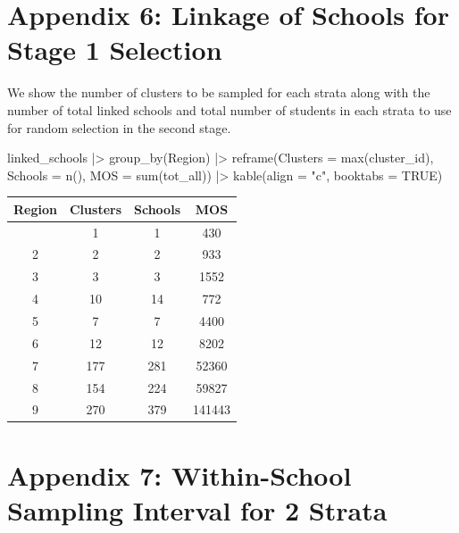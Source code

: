 \documentclass[
  12pt]{article}
\newenvironment{Shaded}{\begin{snugshade}}{\end{snugshade}}
\newcommand{\AttributeTok}[1]{\textcolor[rgb]{0.40,0.45,0.13}{#1}}
\newcommand{\ConstantTok}[1]{\textcolor[rgb]{0.56,0.35,0.01}{#1}}
\newcommand{\FunctionTok}[1]{\textcolor[rgb]{0.28,0.35,0.67}{#1}}
\newcommand{\NormalTok}[1]{\textcolor[rgb]{0.00,0.23,0.31}{#1}}
\newcommand{\SpecialCharTok}[1]{\textcolor[rgb]{0.37,0.37,0.37}{#1}}
\newcommand{\StringTok}[1]{\textcolor[rgb]{0.13,0.47,0.30}{#1}}
\begin{document}
\newpage

\section{Appendix 6: Linkage of Schools for Stage 1
Selection}\label{appendix-6-linkage-of-schools-for-stage-1-selection}

We show the number of clusters to be sampled for each strata along with
the number of total linked schools and total number of students in each
strata to use for random selection in the second stage.

\begin{Shaded}
\begin{Highlighting}[]
\NormalTok{linked\_schools }\SpecialCharTok{|\textgreater{}} 
  \FunctionTok{group\_by}\NormalTok{(Region) }\SpecialCharTok{|\textgreater{}} 
  \FunctionTok{reframe}\NormalTok{(}\AttributeTok{Clusters =} \FunctionTok{max}\NormalTok{(cluster\_id), }\AttributeTok{Schools =} \FunctionTok{n}\NormalTok{(), }\AttributeTok{MOS =} \FunctionTok{sum}\NormalTok{(tot\_all)) }\SpecialCharTok{|\textgreater{}} 
    \FunctionTok{kable}\NormalTok{(}\AttributeTok{align =} \StringTok{"c"}\NormalTok{, }\AttributeTok{booktabs =} \ConstantTok{TRUE}\NormalTok{) }
\end{Highlighting}
\end{Shaded}

\begin{longtable}[]{@{}cccc@{}}
\toprule\noalign{}
Region & Clusters & Schools & MOS \\
\midrule\noalign{}
\endhead
\bottomrule\noalign{}
\endlastfoot
1 & 1 & 1 & 430 \\
2 & 2 & 2 & 933 \\
3 & 3 & 3 & 1552 \\
4 & 10 & 14 & 772 \\
5 & 7 & 7 & 4400 \\
6 & 12 & 12 & 8202 \\
7 & 177 & 281 & 52360 \\
8 & 154 & 224 & 59827 \\
9 & 270 & 379 & 141443 \\
\end{longtable}

\newpage

\section{Appendix 7: Within-School Sampling Interval for 2
Strata}\label{appendix-7-within-school-sampling-interval-for-2-strata}
\end{document}
